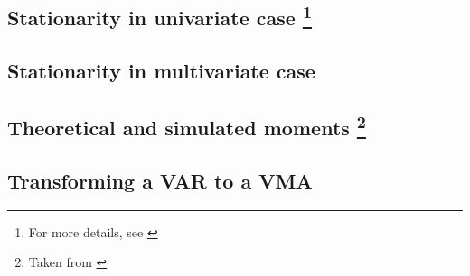 \documentclass[11pt]{article}
\newcommand*{\svar}{SVAR}
\begin{document}
% 

\subsection{Stationarity in univariate case\texorpdfstring{%
    \protect\footnote{For more details, see \cite[][see Chapter 3, Stationary ARMA processes]{Hamilton-1994}}%
}{}}


\subsection{Stationarity in multivariate case}


\subsection{Theoretical and simulated moments\texorpdfstring{%
    \protect\footnote{Taken from \cite[][see Sectiona 18, "Theoretical and simulated moments]{Mutschler-2018-github_repo}}%
}{}}


\subsection{Transforming a VAR to a VMA}


% 









\end{document}
